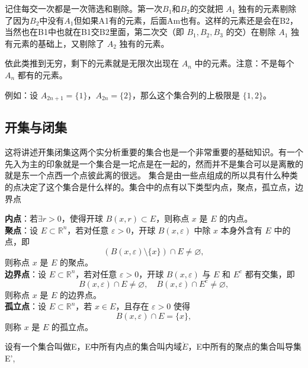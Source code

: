 \documentclass[lang=cn,10pt]{elegantbook}
\begin{document}
\par

记住每交一次都是一次筛选和剔除。第一次$B_1和B_2$的交就把 $A_1$ 独有的元素剔除了因为$B_2$中没有$A_1$但如果A1有的元素，后面Am也有。这样的元素还是会在B2，当然也在B1中也就在B1交B2里面，第二次交（即 $B_1, B_2, B_3$ 的交）在剔除 $A_1$ 独有元素的基础上，又剔除了 $A_2$ 独有的元素。

\par

依此类推到无穷，剩下的元素就是无限次出现在 $A_n$ 中的元素。注意：不是每个 $A_n$ 都有的元素。

例如：设 $A_{2n+1} = \{1\}$，$A_{2n} = \{2\}$，那么这个集合列的上极限是 $\{1, 2\}$。
\subsection{开集与闭集}
这将讲述开集闭集这两个实分析重要的集合也是一个非常重要的基础知识。有一个先入为主的印象就是一个集合是一坨点是在一起的，然而并不是集合可以是离散的就是东一个点西一个点彼此离的很远。
集合是由一些点组成的所以具有什么种类的点决定了这个集合是什么样的。集合中的点有以下类型内点，聚点，孤立点，边界点
\begin{definition}
    \textbf{内点}：若$\exists r>0$，使得开球 $B(x, r) \subset E$，则称点 $x$ 是 $E$ 的内点。\\
    \textbf{聚点}：设 $E \subset \mathbb{R}^n$，若对任意 $\varepsilon > 0$，开球 $B(x, \varepsilon)$ 中除 $x$ 本身外含有 $E$ 中的点，即
\[
(B(x, \varepsilon) \setminus \{x\}) \cap E \neq \varnothing,
\]
则称点 $x$ 是 $E$ 的聚点。\\
\textbf{边界点}：设 $E \subset \mathbb{R}^n$，若对任意 $\varepsilon > 0$，开球 $B(x, \varepsilon)$ 与 $E$ 和 $E^c$ 都有交集，即
\[
B(x, \varepsilon) \cap E \neq \varnothing,\quad B(x, \varepsilon) \cap E^c \neq \varnothing,
\]
则称点 $x$ 是 $E$ 的边界点。\\
\textbf{孤立点}：设 $E \subset \mathbb{R}^n$，若 $x \in E$，且存在 $\varepsilon > 0$ 使得
\[
B(x, \varepsilon) \cap E = \{x\},
\]
则称 $x$ 是 $E$ 的孤立点。
\end{definition}
设有一个集合叫做E，E中所有内点的集合叫内域$\mathring{E}$，E中所有的聚点的集合叫导集E',
\end{document}
